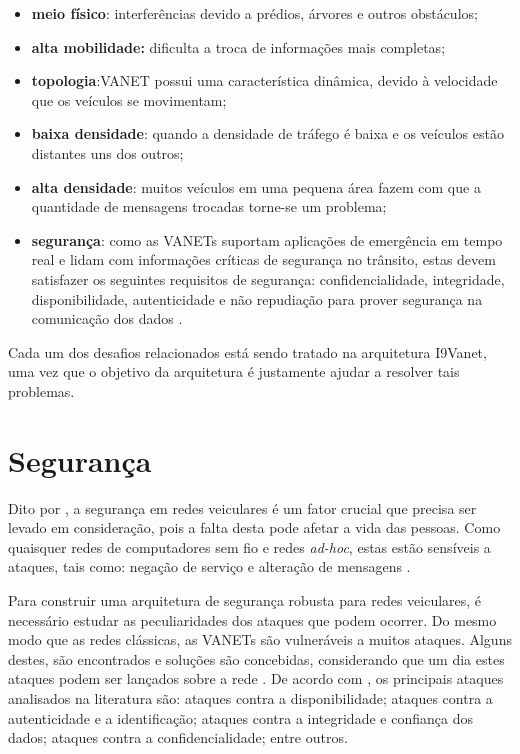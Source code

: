 \documentclass[
	12pt,				%
	oneside,			%
	a4paper,			%
	english,			%
	brazil				%
	]{abntex2ppgsi}
\begin{document}
\begin{itemize}
	\item{\textbf{meio físico}: interferências devido a prédios,  árvores e outros obstáculos;}
	\item{\textbf{alta mobilidade:} dificulta a troca de informações mais completas; }
	\item{\textbf{topologia}:VANET possui uma característica dinâmica, devido à velocidade que os veículos se movimentam;}	
	\item{\textbf{baixa densidade}: quando a densidade de tráfego é baixa e os veículos estão distantes uns dos outros;}
	\item{\textbf{alta densidade}: muitos veículos em uma pequena área fazem com que a quantidade de mensagens trocadas torne-se um problema;}
	\item{\textbf{segurança}: como as VANETs suportam aplicações de emergência em tempo real e lidam com informações	críticas de segurança no trânsito, estas devem satisfazer os seguintes requisitos de segurança: confidencialidade, integridade, disponibilidade, autenticidade e não repudiação para prover segurança na comunicação dos dados \cite{samara2010security} \cite{matos2013analise}.}
	
\end{itemize} 

Cada um dos desafios relacionados está sendo tratado na arquitetura I9Vanet, uma vez que o objetivo da arquitetura é justamente ajudar a resolver tais problemas.


\section{Segurança}

Dito por , a segurança em redes veiculares é um fator crucial que precisa ser levado em consideração, pois a falta desta pode afetar a vida das pessoas. Como quaisquer redes de computadores sem fio e redes \textit{ad-hoc}, estas estão sensíveis a ataques, tais como: 	negação de serviço e alteração de mensagens \cite{raya2006securing}.

Para construir uma arquitetura de segurança robusta para redes veiculares, é necessário estudar as peculiaridades dos ataques que podem ocorrer. Do mesmo modo que as redes clássicas, as VANETs são vulneráveis a muitos ataques. Alguns destes, são encontrados e soluções são concebidas, considerando que um dia estes ataques podem ser lançados sobre a rede \cite{engoulou2014vanet}. De acordo com ,  os principais ataques analisados na literatura são: ataques contra a disponibilidade; ataques contra a autenticidade e a identificação; ataques contra a integridade e confiança dos dados; ataques contra a confidencialidade; entre outros.
\end{document}
